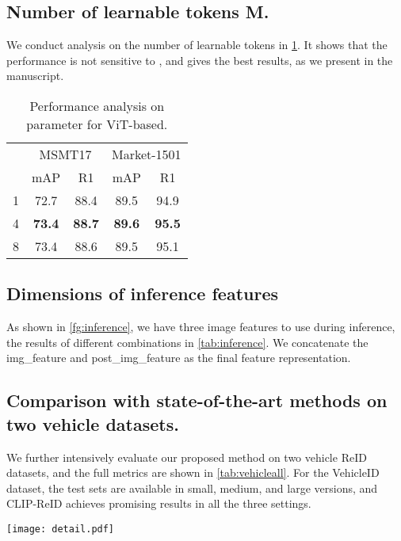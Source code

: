 \documentclass[letterpaper]{article} \usepackage{aaai23}  \usepackage{times}  \usepackage{helvet}  \usepackage{courier}  \usepackage[hyphens]{url}  \usepackage{graphicx} \urlstyle{rm} \def\UrlFont{\rm}  \usepackage{natbib}  \usepackage{caption} \frenchspacing  \setlength{\pdfpagewidth}{8.5in}  \setlength{\pdfpageheight}{11in}  \usepackage{algorithm}
\begin{document}
\subsection{Number of learnable tokens M.}
We conduct analysis on the number of learnable tokens  in \cref{tab:numM}. It shows that the performance is not sensitive to , and  gives the best results, as we present in the manuscript.


\begin{table}[h]
\centering
\begin{tabular}{l|cccc}
\hline
\multirow{2}{*}{} & \multicolumn{2}{c}{MSMT17} & \multicolumn{2}{c}{Market-1501} \\
 & mAP & R1 & mAP & R1 \\ \hline
1 & 72.7 & 88.4 & 89.5 & 94.9 \\
4 & \textbf{73.4} & \textbf{88.7} & \textbf{89.6} & \textbf{95.5} \\
8 & 73.4 & 88.6 & 89.5 & 95.1 \\ \hline
\end{tabular}
\caption{Performance analysis on parameter  for ViT-based.}
\label{tab:numM}
\end{table}



\subsection{Dimensions of inference features}
As shown in \cref{fg:inference}, we have three image features to use during inference, the results of different combinations in \cref{tab:inference}. We concatenate the img\_feature and post\_img\_feature as the final feature representation.


\subsection{Comparison with state-of-the-art methods on two vehicle datasets.}
We further intensively evaluate our proposed method on two vehicle ReID datasets, and the full metrics are shown in \cref{tab:vehicleall}. For the VehicleID dataset, the test sets are available in small, medium, and large versions, and CLIP-ReID achieves promising results in all the three settings. 



\begin{figure*}[]
\centering
\texttt{[image: detail.pdf]}
\caption{Details of the CNN-based CLIP-ReID image encoder.}
\label{fg:inference}
\end{figure*}
\end{document}
